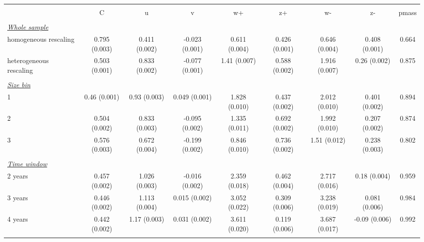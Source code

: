 
\begin{tabular}{@{\extracolsep{5pt}} l cccccccc} 
\\[-1.8ex]\hline 
\hline \\[-1.8ex] 
  & C & u & v & w+ & z+ & w- & z- & pmass \\ 
\hline \\[-1.8ex] 
\underline{{\it Whole sample}} &   &   &   &   &   &   &   &  \\ 
homogeneous rescaling & 0.795 (0.003) & 0.411 (0.002) & -0.023 (0.001) & 0.611 (0.004) & 0.426 (0.001) & 0.646 (0.004) & 0.408 (0.001) & 0.664 \\ 
heterogeneous rescaling & 0.503 (0.001) & 0.833 (0.002) & -0.077 (0.001) & 1.41 (0.007) & 0.588 (0.002) & 1.916 (0.007) & 0.26 (0.002) & 0.875 \\ 
 &   &   &   &   &   &   &   &  \\ 
\underline{{\it Size bin}} &   &   &   &   &   &   &   &  \\ 
1 & 0.46 (0.001) & 0.93 (0.003) & 0.049 (0.001) & 1.828 (0.010) & 0.437 (0.002) & 2.012 (0.010) & 0.401 (0.002) & 0.894 \\ 
2 & 0.504 (0.002) & 0.833 (0.003) & -0.095 (0.002) & 1.335 (0.011) & 0.692 (0.002) & 1.992 (0.010) & 0.207 (0.002) & 0.874 \\ 
3 & 0.576 (0.003) & 0.672 (0.004) & -0.199 (0.002) & 0.846 (0.010) & 0.736 (0.002) & 1.51 (0.012) & 0.238 (0.003) & 0.802 \\ 
 &   &   &   &   &   &   &   &  \\ 
\underline{{\it Time window}} &   &   &   &   &   &   &   &  \\ 
2 years & 0.457 (0.002) & 1.026 (0.003) & -0.016 (0.002) & 2.359 (0.018) & 0.462 (0.004) & 2.717 (0.016) & 0.18 (0.004) & 0.959 \\ 
3 years & 0.446 (0.002) & 1.113 (0.004) & 0.015 (0.002) & 3.052 (0.022) & 0.309 (0.006) & 3.238 (0.019) & 0.081 (0.006) & 0.984 \\ 
4 years & 0.442 (0.002) & 1.17 (0.003) & 0.031 (0.002) & 3.611 (0.020) & 0.119 (0.006) & 3.687 (0.017) & -0.09 (0.006) & 0.992 \\ 
\hline \\[-1.8ex] 
\end{tabular} 

